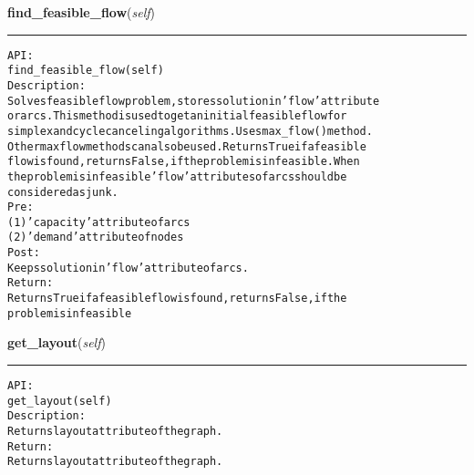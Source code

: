 \hspace{.8\funcindent}\begin{boxedminipage}{\funcwidth}

    \raggedright \textbf{find\_feasible\_flow}(\textit{self})

    \vspace{-1.5ex}

    \rule{\textwidth}{0.5\fboxrule}
\setlength{\parskip}{2ex}
\begin{alltt}

API:
    find\_feasible\_flow(self)
Description:
    Solves feasible flow problem, stores solution in 'flow' attribute
    or arcs. This method is used to get an initial feasible flow for
    simplex and cycle canceling algorithms. Uses max\_flow() method.
    Other max flow methods can also be used. Returns True if a feasible
    flow is found, returns False, if the problem is infeasible. When
    the problem is infeasible 'flow' attributes of arcs should be
    considered as junk.
Pre:
    (1) 'capacity' attribute of arcs
    (2) 'demand' attribute of nodes
Post:
    Keeps solution in 'flow' attribute of arcs.
Return:
    Returns True if a feasible flow is found, returns False, if the
    problem is infeasible
\end{alltt}

\setlength{\parskip}{1ex}
    \end{boxedminipage}

    \label{coinor:gimpy:graph:Graph:get_layout}

    \vspace{0.5ex}

\hspace{.8\funcindent}\begin{boxedminipage}{\funcwidth}

    \raggedright \textbf{get\_layout}(\textit{self})

    \vspace{-1.5ex}

    \rule{\textwidth}{0.5\fboxrule}
\setlength{\parskip}{2ex}
\begin{alltt}

API:
    get\_layout(self)
Description:
Returns layout attribute of the graph.
Return:
    Returns layout attribute of the graph.
\end{alltt}

\setlength{\parskip}{1ex}
    \end{boxedminipage}

